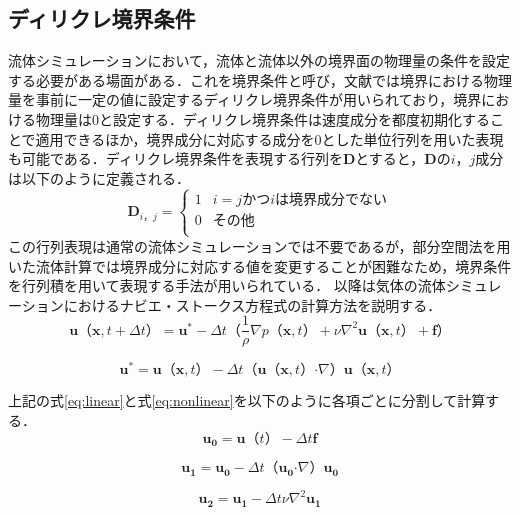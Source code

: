 \documentclass[a4j,12pt]{jreport}
\begin{document}
\subsection{ディリクレ境界条件}
流体シミュレーションにおいて，流体と流体以外の境界面の物理量の条件を設定する必要がある場面がある．これを境界条件と呼び，文献\cite{fedkiw}では境界における物理量を事前に一定の値に設定するディリクレ境界条件が用いられており，境界における物理量は$0$と設定する．ディリクレ境界条件は速度成分を都度初期化することで適用できるほか，境界成分に対応する成分を0とした単位行列を用いた表現も可能である．ディリクレ境界条件を表現する行列を$\mathbf{D}$とすると，$\mathbf{D}$の$i，j$成分は以下のように定義される．
\begin{equation}
	\mathbf{D}_{i，j} = \begin{cases}
 	1 	& i = j かつ iは境界成分でない\\
 	0  		& その他\\
 \end{cases}
\end{equation}
この行列表現は通常の流体シミュレーションでは不要であるが，部分空間法を用いた流体計算では境界成分に対応する値を変更することが困難なため，境界条件を行列積を用いて表現する手法が用いられている．
以降は気体の流体シミュレーションにおけるナビエ・ストークス方程式の計算方法を説明する．
\begin{equation}\label{eq:linear}
	\bm{u} （\bm{x},t + \varDelta t）  =  \bm{u}^* - \varDelta t （\frac{1}{\rho}\nabla p （\bm{x},t）  + \nu\nabla^2\bm{u} （\bm{x},t）  + \bm{f}） 
\end{equation} 

\begin{equation}\label{eq:nonlinear}
	\bm{u}^* = \bm{u} （\bm{x},t）  - \varDelta t （\bm{u} （\bm{x},t）  \boldsymbol{\cdot}\nabla） \bm{u} （\bm{x},t）  
\end{equation}

上記の式\ref{eq:linear}と式\ref{eq:nonlinear}を以下のように各項ごとに分割して計算する．
\begin{equation}\label{eq:force}
	\bm{u_0} =  \bm{u} （t）  - \varDelta t \bm{f} 
\end{equation} 

\begin{equation}\label{eq:advect}
	\bm{u_1} = \bm{u_0}  - \varDelta t （\bm{u_0}  \boldsymbol{\cdot}\nabla） \bm{u_0}
\end{equation}

\begin{equation}\label{eq:diffusion}
	\bm{u_2}   =  \bm{u_1} - \varDelta t \nu\nabla^2\bm{u_1}
\end{equation}
\end{document}
